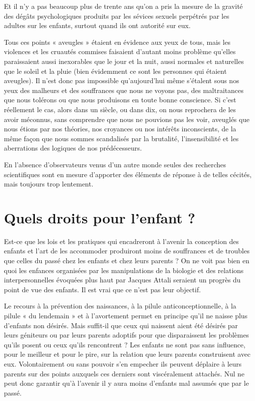  Et il n'y a pas beaucoup plus de trente ans qu'on a pris la mesure de la gravité des dégâts psychologiques produits par les sévices sexuels perpétrés par les adultes sur les enfants, surtout quand ils ont autorité sur eux. 
 
 Tous ces points « aveugles » étaient en évidence aux yeux de tous, mais les violences et les cruautés commises faisaient d'autant moins problème qu'elles paraissaient aussi inexorables que le jour et la nuit, aussi normales et naturelles que le soleil et la pluie (bien évidemment ce sont les personnes qui étaient aveugles). Il n'est donc pas impossible qu'aujourd'hui même s'étalent sous nos yeux des malheurs et des souffrances que nous ne voyons pas, des maltraitances que nous tolérons ou que nous produisons en toute bonne conscience. Si c'est réellement le cas, alors dans un siècle, ou dans dix, on nous reprochera de les avoir méconnus, sans comprendre que nous ne pouvions pas les voir, aveuglés que nous étions par nos théories, nos croyances ou nos intérêts inconscients, de la même façon que nous sommes scandalisés par la brutalité, l'insensibilité et les aberrations des logiques de nos prédécesseurs. 
 
 En l'absence d'observateurs venus d'un autre monde seules des recherches scientifiques sont en mesure d'apporter des éléments de réponse à de telles cécités, mais toujours trop lentement.


 \chapter{Quels droits pour l'enfant ?}
 
 Est-ce que les lois et les pratiques qui encadreront à l'avenir la conception des enfants et l'art de les accommoder produiront moins de souffrances et de troubles que celles du passé chez les enfants et chez leurs parents ? On ne voit pas bien en quoi les enfances organisées par les manipulations de la biologie et des relations interpersonnelles évoquées plus haut par Jacques Attali seraient un progrès du point de vue des enfants. Il est vrai que ce n'est pas leur objectif. 

 Le recours à la prévention des naissances, à la pilule anticonceptionnelle, à la pilule « du lendemain » et à l'avortement permet en principe qu'il ne naisse plus d'enfants non désirés. Mais suffit-il que ceux qui naissent aient été désirés par leurs géniteurs ou par leurs parents adoptifs pour que disparaissent les problèmes qu'ils posent ou ceux qu'ils rencontrent ? Les enfants ne sont pas sans influence, pour le meilleur et pour le pire, sur la relation que leurs parents construisent avec eux. Volontairement ou sans pouvoir s'en empecher ils peuvent déplaire à leurs parents sur des points auxquels ces derniers sont viscéralement attachés. Nul ne peut donc garantir qu'à l'avenir il y aura moins d'enfants mal assumés que par le passé. 


